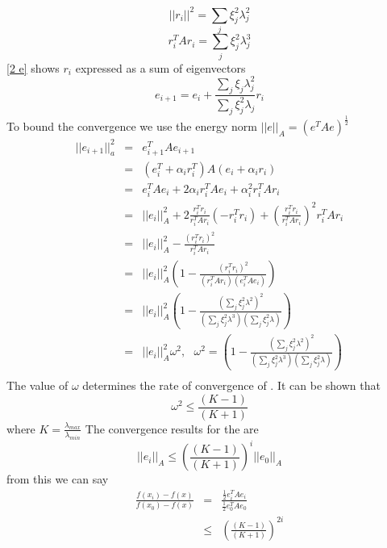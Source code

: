 \begin{equation}
||r_i||^2 = \sum_j \xi_j^2 \lambda_j^2
\end{equation}
\begin{equation}
r_i^TAr_i = \sum_j \xi_j^2 \lambda_j^3
\end{equation}
\ref{2 e} shows $r_i$ expressed as a sum of eigenvectors
\begin{equation}
e_{i+1} = e_{i} +\frac{\sum_j\xi_j\lambda_j^2}{\sum_j \xi_j^2 \lambda_j}r_i
\end{equation}
To bound the convergence we use the energy norm $||e||_A=(e^TAe)^{\frac{1}{2}}$
\begin{eqnarray*}
||e_{i+1}||^2_a &= &e_{i+1}^TAe_{i+1}\\
&=&(e_i^T+\alpha_ir_i^T)A(e_i + \alpha_i r_i)\\
&=& e_i^TAe_i+2 \alpha_i r_i^TAe_i + \alpha^2_i r_i^T A r_i \\
& = & ||e_i||^2_A+2\frac{r_i^Tr_i}{r_i^TAr_i}(-r_i^Tr_i)+\left(\frac{r_i^Tr_i}{r_i^TAr_i}\right)^2r_i^TAr_i\\
&=&||e_i||_A^2-\frac{(r_i^Tr_i)^2}{r_i^TAr_i}\\
&=&||e_i||_A^2\left( 1-\frac{(r_i^Tr_i)^2}{(r_i^TAr_i)(e_i^TAe_i)}\right)\\
&=&||e_i||_A^2\left( 1-\frac{(\sum_{j}\xi_{j}^2\lambda^2)^2}{(\sum_j \xi_{j}^2\lambda^3 )( \sum_{j}\xi_{j}^2\lambda  )}\right)\\
&=&||e_i||_A^2\omega^2, \ \ \ \omega^2=\left( 1-\frac{(\sum_{j}\xi_{j}^2\lambda^2)^2}{(\sum_j \xi_{j}^2\lambda^3 )( \sum_{j}\xi_{j}^2\lambda  )}\right)\\
\end{eqnarray*}
The value of $\omega$ determines the rate of convergence of . 
It can be shown that 
\[ \omega^2 \leq \frac{(K-1)}{(K+1)} \]
where $K=\frac{\lambda_{max}}{\lambda_{min}}$
The convergence results for the  are 
\[||e_i||_A\leq\left(\frac{(K-1)}{(K+1)}\right)^i||e_0||_A \]
from this we can say
\begin{eqnarray*}
 \frac{f(x_i)-f(x)}{f(x_0)-f(x)} &=& \frac{\frac{1}{2}e_i^TAe_i}{\frac{1}{2}e_0^TAe_0}\\
&\leq  &\left(\frac{(K-1)}{(K+1)}\right)^{2i}
\end{eqnarray*}
